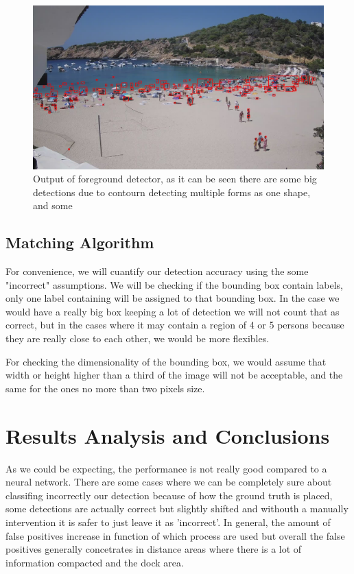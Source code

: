 \documentclass[10pt]{article}
\begin{document}
\begin{figure}
    \centering
    \includegraphics[width=\textwidth]{img/det_name.jpg}
    \caption{Output of foreground detector, as it can be seen there are some big detections due to contourn detecting multiple forms as one shape, and some }
    \label{fig:detections}
\end{figure}

\subsection{Matching Algorithm}
For convenience, we will cuantify our detection accuracy using the some "incorrect" assumptions. We will be checking if the bounding box contain labels, only one label containing will be assigned to that bounding box. In the case we would have a really big box keeping a lot of detection we will not count that as correct, but in the cases where it may contain a region of 4 or 5 persons because they are really close to each other, we would be more flexibles.\newline

For checking the dimensionality of the bounding box, we would assume that width or height higher than a third of the image will not be acceptable, and the same for the ones no more than two pixels size. 

\section{Results Analysis and Conclusions}

As we could be expecting, the performance is not really good compared to a neural network. There are some cases where we can be completely sure about classifing incorrectly our detection because of how the ground truth is placed, some detections are actually correct but slightly shifted and withouth a manually intervention it is safer to just leave it as 'incorrect'. In general, the amount of false positives increase in function of which process are used but overall the false positives generally concetrates in distance areas where there is a lot of information compacted and the dock area.\newline
\end{document}
